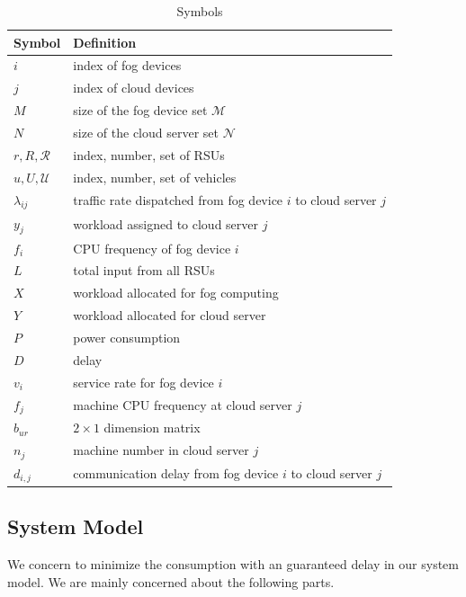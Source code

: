\documentclass[journal]{IEEEtran}
\begin{document}
\begin{table}[h]
	\centering
	\begin{tabular}{p{1cm}p{5cm}}
	\hline
	Symbol & Definition \\\hline
	$i$ & index of fog devices\\
	$j$ & index of cloud devices\\
	$M$ & size of the fog device set $\mathcal{M}$\\
	$N$ & size of the cloud server set $\mathcal{N}$\\
	$r,R,\mathcal{R}$ & index, number, set of RSUs\\
	$u,U,\mathcal{U}$ & index, number, set of vehicles\\
	$\lambda_{ij}$    & traffic rate dispatched from fog device $i$ to cloud server $j$\\
	$y_j$             & workload assigned to cloud server $j$\\
	$f_i$	          & CPU frequency of fog device $i$ \\
	$L$               & total input from all RSUs\\
	$X$               & workload allocated for fog computing\\
	$Y$               & workload allocated for cloud server\\
	$P$               & power consumption\\
	$D$               & delay\\
	$v_i$             & service rate for fog device $i$\\
	$f_j$             & machine CPU frequency at cloud server $j$\\
	$b_{ur}$               & $2 \times 1$ dimension matrix\\      
	$n_j$             & machine number in cloud server $j$\\
	$d_{i,j}$         & communication delay from fog device $i$ to cloud server $j$\\\hline
	\end{tabular}
	\caption{Symbols}
\end{table}


\subsection{System Model}
We concern to minimize the consumption with an guaranteed delay in our system model. We are mainly concerned about the following parts.
\end{document}
